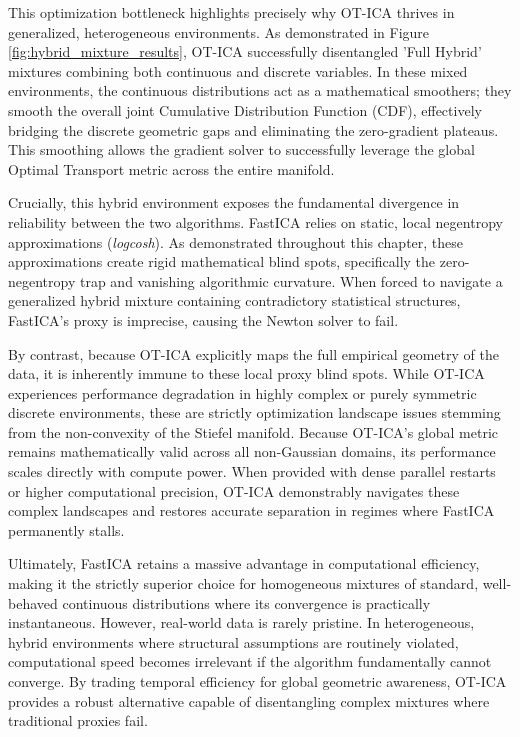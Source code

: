 \documentclass[12pt,a4paper,twoside,openany]{book}
\begin{document}
This optimization bottleneck highlights precisely why OT-ICA thrives in generalized, heterogeneous environments. As demonstrated in Figure \ref{fig:hybrid_mixture_results}, 
OT-ICA successfully disentangled 'Full Hybrid' mixtures combining both continuous and discrete variables. In these mixed environments, the continuous distributions act as a mathematical smoothers; 
they smooth the overall joint Cumulative Distribution Function (CDF), effectively bridging the discrete geometric gaps and eliminating the zero-gradient plateaus. 
This smoothing allows the gradient solver to successfully leverage the global Optimal Transport metric across the entire manifold.

Crucially, this hybrid environment exposes the fundamental divergence in reliability between the two algorithms. FastICA relies on static, 
local negentropy approximations (\textit{logcosh}). As demonstrated throughout this chapter, these approximations create rigid mathematical blind spots, specifically 
the zero-negentropy trap and vanishing algorithmic curvature. When forced to navigate a generalized hybrid mixture containing contradictory statistical structures, 
FastICA's proxy is imprecise, causing the Newton solver to fail.

By contrast, because OT-ICA explicitly maps the full empirical geometry of the data, it is inherently immune to these local proxy blind spots. 
While OT-ICA experiences performance degradation in highly complex or purely symmetric discrete environments, these are strictly optimization landscape issues stemming from 
the non-convexity of the Stiefel manifold. Because OT-ICA's global metric remains mathematically valid across all non-Gaussian domains, its performance scales directly with compute power. 
When provided with dense parallel restarts or higher computational precision, OT-ICA demonstrably navigates these complex landscapes and restores accurate separation in 
regimes where FastICA permanently stalls.

Ultimately, FastICA retains a massive advantage in computational efficiency, making it the strictly superior choice for homogeneous mixtures of standard, 
well-behaved continuous distributions where its convergence is practically instantaneous. However, real-world data is rarely pristine. 
In heterogeneous, hybrid environments where structural assumptions are routinely violated, computational speed becomes irrelevant if the algorithm fundamentally cannot converge. 
By trading temporal efficiency for global geometric awareness, OT-ICA provides a robust alternative capable of disentangling complex mixtures where traditional proxies fail.
\end{document}
